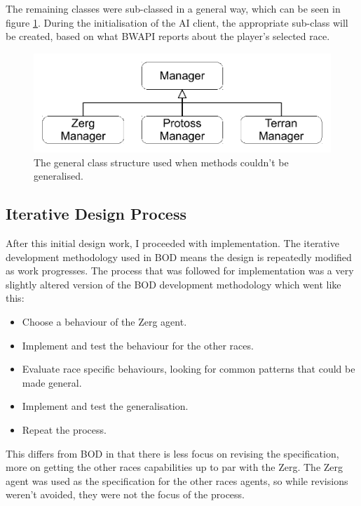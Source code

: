 \documentclass[11pt,openright,a4paper]{report}
\begin{document}
The remaining classes were sub-classed in a general way, which can be seen in figure \ref{fig:GeneralStructure}. During the initialisation of the AI client, the appropriate sub-class will be created, based on what BWAPI reports about the player's selected race.

\begin{figure}[h]
    \centering
    \includegraphics[scale=0.5]{GeneralStructure}
    \caption{The general class structure used when methods couldn't be generalised.}
    \label{fig:GeneralStructure}
\end{figure}

\subsection{Iterative Design Process}
After this initial design work, I proceeded with implementation. The iterative development methodology used in BOD means the design is repeatedly modified as work progresses. The process that was followed for implementation was a very slightly altered version of the BOD development methodology which went like this:
\begin{itemize}
\item{Choose a behaviour of the Zerg agent.}
\item{Implement and test the behaviour for the other races.}
\item{Evaluate race specific behaviours, looking for common patterns that could be made general.}
\item{Implement and test the generalisation.}
\item{Repeat the process.}
\end{itemize}

 This differs from BOD in that there is less focus on revising the specification, more on getting the other races capabilities up to par with the Zerg. The Zerg agent was used as the specification for the other races agents, so while revisions weren't avoided, they were not the focus of the process.
\end{document}
